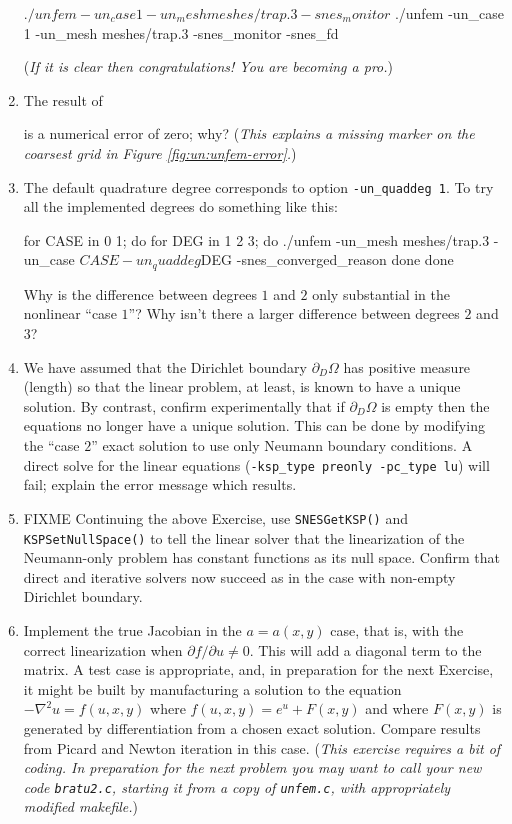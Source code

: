 \begin{enumerate}
\begin{cline}
$ ./unfem -un_case 1 -un_mesh meshes/trap.3 -snes_monitor
$ ./unfem -un_case 1 -un_mesh meshes/trap.3 -snes_monitor -snes_fd
\end{cline}
(\emph{If it is clear then congratulations!  You are becoming a \pSNES pro.})
\item The result of
is a numerical error of zero; why?  (\emph{This explains a missing marker on the coarsest grid in Figure \ref{fig:un:unfem-error}.})
\item The default quadrature degree corresponds to option \texttt{-un\_quaddeg 1}.  To try all the implemented degrees do something like this:
\begin{code}
for CASE in 0 1; do
    for DEG in 1 2 3; do
        ./unfem -un_mesh meshes/trap.3 -un_case $CASE -un_quaddeg $DEG -snes_converged_reason
    done
done
\end{code}
Why is the difference between degrees $1$ and $2$ only substantial in the nonlinear ``case $1$''?  Why isn't there a larger difference between degrees $2$ and $3$?
\item \label{exer:un:allneumannfailure}  We have assumed that the Dirichlet boundary $\partial_D \Omega$ has positive measure (length) so that the linear problem, at least, is known to have a unique solution.  By contrast, confirm experimentally that if $\partial_D\Omega$ is empty then the equations no longer have a unique solution.  This can be done by modifying the ``case $2$'' exact solution to use only Neumann boundary conditions.  A direct solve for the linear equations (\texttt{-ksp\_type preonly -pc\_type lu}) will fail; explain the error message which results.
\item \label{exer:un:allneumannresolution}  FIXME Continuing the above Exercise, use \texttt{SNESGetKSP()} and \texttt{KSPSetNullSpace()} to tell the linear solver that the linearization of the Neumann-only problem has constant functions as its null space.  Confirm that direct and iterative solvers now succeed as in the case with non-empty Dirichlet boundary.
\item \label{exer:un:truejacobian} Implement the true Jacobian in the $a=a(x,y)$ case, that is, with the correct linearization when $\partial f/\partial u$.  This will add a diagonal term to the matrix.  A test case is appropriate, and, in preparation for the next Exercise, it might be built by manufacturing a solution to the equation $-\nabla^2 u = f(u,x,y)$ where $f(u,x,y) = e^u + F(x,y)$ and where $F(x,y)$ is generated by differentiation from a chosen exact solution.  Compare results from Picard and Newton iteration in this case.  (\emph{This exercise requires a bit of coding.  In preparation for the next problem you may want to call your new code \texttt{bratu2.c}, starting it from a copy of \texttt{unfem.c}, with appropriately modified makefile.})

\end{enumerate}
